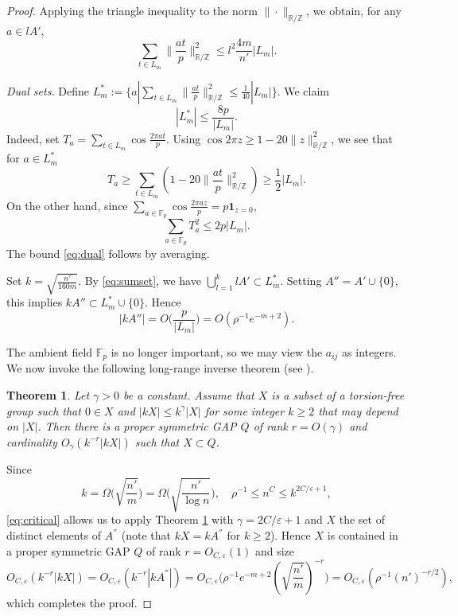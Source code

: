 \documentclass[reqno]{amsart}
\newcommand\R{{\mathbb{R}}}
\newcommand\Z{{\mathbb{Z}}}
\newcommand\F{{\mathbb{F}}}
\newcommand\eps{{\varepsilon}}
\theoremstyle{plain}
\newtheorem{theorem}{Theorem}[section]
\theoremstyle{definition}
\begin{document}
\begin{proof}
Applying the triangle inequality to the norm $\|\cdot\|_{\R/\Z}$, we obtain, for any $a \in l A'$,
\begin{equation}\label{eq:sumset}
\sum_{t \in L_{m}}\|\frac{a t}{p}\|^2_{\R/\Z} \leq l^{2} \frac{4m}{n'}|L_{m}|.
\end{equation}


\textit{Dual sets.} Define $L_{m}^{*}:=\big\{a|\sum_{t \in L_{m}}\|\frac{a t}{p}\|^2_{\R/\Z} \leq \frac{1}{40}|L_{m}|\big\}$. We claim
\begin{equation}\label{eq:dual}
|L_{m}^{*}| \leq \frac{8 p}{|L_{m}|}.
\end{equation}
Indeed, set $T_{a}=\sum_{t \in L_{m}} \cos \frac{2 \pi a t}{p}$. Using $\cos 2 \pi z \geq 1-20\|z\|^2_{\R/\Z}$, we see that for $a \in L_{m}^{*}$
$$
T_{a} \geq \sum_{t \in L_{m}}(1-20\|\frac{a t}{p}\|^2_{\R/\Z}) \geq \frac{1}{2}|L_{m}|.
$$
On the other hand, since $\sum_{a \in \F_p} \cos \frac{2 \pi a z}{p}=p \mathbf{1}_{z=0}$,
$$
\sum_{a \in \F_p} T_{a}^{2} \leq 2 p|L_{m}|.
$$
The bound \eqref{eq:dual} follows by averaging.

Set $k=\sqrt{\frac{n'}{160m}}$. By \eqref{eq:sumset}, we have $\bigcup_{l=1}^k lA' \subset L_m^*$. Setting $A''=A'\cup\{0\}$, this implies $kA''\subset L_m^*\cup\{0\}$. Hence
\begin{equation}\label{eq:critical}
|kA''|=O\Big(\frac{p}{|L_m|}\Big)=O(\rho^{-1}e^{-m+2}).
\end{equation}


The ambient field $\F_p$ is no longer important, so we may view the $a_{ij}$ as integers. We now invoke the following long-range inverse theorem (see \cite[Theorem 3.2]{NgV-Adv}).

\begin{theorem}\label{thm:Freiman-inverse}
Let $\gamma > 0$ be a constant. Assume that $X$ is a subset of a torsion-free group such that $0 \in X$ and $|kX| \le k^{\gamma} |X|$ for some integer $k \ge 2$ that may depend on $|X|$. Then there is a proper symmetric GAP $Q$ of rank $r = O(\gamma)$ and cardinality $O_{\gamma}(k^{-r} |kX|)$ such that $X \subset Q$.
\end{theorem}

Since 
$$k=\Omega\Big(\sqrt{\frac{n'}{m}}\Big)=\Omega\Big(\sqrt{\frac{n'}{\log n}}\Big), \quad \rho^{-1} \leq n^{C} \le k^{2 C/\eps+1},
$$
\eqref{eq:critical} allows us to apply Theorem \ref{thm:Freiman-inverse} with $\gamma=2C/\eps+1$ and $X$ the set of distinct elements of $A^{''}$ (note that $k X=k A^{''}$ for $k \geq 2$). Hence $X$ is contained in a proper symmetric GAP $Q$ of rank $r = O_{C, \eps}(1)$ and size
$$
O_{C, \eps}(k^{-r}|kX|)= O_{C, \eps}(k^{-r}|kA^{''}|)= O_{C, \eps}\Big(\rho^{-1}e^{-m+2}(\sqrt{\frac{n'}{m}})^{-r}\Big)= O_{C,\eps}(\rho^{-1}(n')^{-r/2}),
$$
which completes the proof.
\end{proof}
\end{document}
